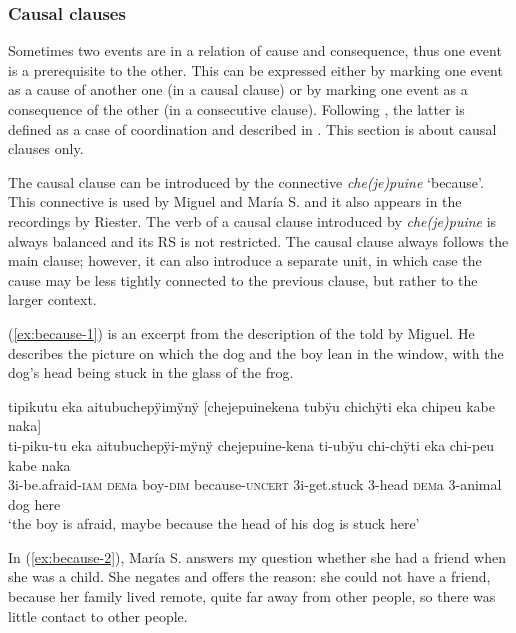 \subsubsection{Causal clauses}\label{sec:CauseConsequence}

Sometimes two events are in a relation of cause and consequence, thus one event is a prerequisite to the other. This can be expressed either by marking one event as a cause of another one (in a causal clause) or by marking one event as a consequence of the other (in a consecutive clause). Following \citet[38]{Cristofaro2003}, the latter is defined as a case of coordination and described in . This section is about causal clauses only.

The causal clause can be introduced by the connective \textit{che(je)puine} ‘because’. This connective is used by Miguel and María S. and it also appears in the recordings by Riester. The verb of a causal clause introduced by \textit{che(je)puine} is always balanced and its RS is not restricted. The causal clause always follows the main clause; however, it can also introduce a separate  unit, in which case the cause may be less tightly connected to the previous clause, but rather to the larger context.


(\ref{ex:because-1}) is an excerpt from the description of the  told by Miguel. He describes the picture on which the dog and the boy lean in the window, with the dog’s head being stuck in the glass of the frog.

\ea\label{ex:because-1}
\begingl
\glpreamble tipikutu eka aitubuchepÿimÿnÿ \textup{[}chejepuinekena tubÿu chichÿti eka chipeu kabe naka\textup{]}\\
\gla ti-piku-tu eka aitubuchepÿi-mÿnÿ chejepuine-kena ti-ubÿu chi-chÿti eka chi-peu kabe naka\\
\glb 3i-be.afraid-\textsc{iam} \textsc{dem}a boy-\textsc{dim} because-\textsc{uncert} 3i-get.stuck 3-head \textsc{dem}a 3-animal dog here\\
\glft ‘the boy is afraid, maybe because the head of his dog is stuck here’
\endgl
\trailingcitation{[mox-a110920l-2.056-057]}
\xe

In (\ref{ex:because-2}), María S. answers my question whether she had a friend when she was a child. She negates and offers the reason: she could not have a friend, because her family lived remote, quite far away from other people, so there was little contact to other people.


